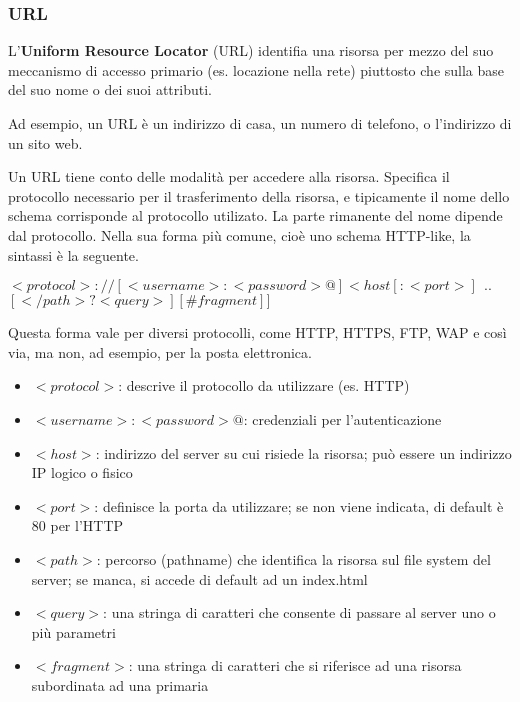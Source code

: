 \subsubsection{URL}
    
L'\textbf{Uniform Resource Locator} (URL) identifia una risorsa per mezzo del suo meccanismo di accesso primario (es. locazione nella rete) piuttosto che sulla base del suo nome o dei suoi attributi.

Ad esempio, un URL è un indirizzo di casa, un numero di telefono, o l'indirizzo di un sito web.

\vspace{3mm}

Un URL tiene conto delle modalità per accedere alla risorsa. Specifica il protocollo necessario per il trasferimento della risorsa, e tipicamente il nome dello schema corrisponde al protocollo utilizato. La parte rimanente del nome dipende dal protocollo. Nella sua forma più comune, cioè uno schema HTTP-like, la sintassi è la seguente.

\begin{center}
\(<protocol>://[<username>:<password>@]<host[:<port>]\ \ ..\)
\([</path>?<query>][\#fragment]]\)
\end{center}

Questa forma vale per diversi protocolli, come HTTP, HTTPS, FTP, WAP e così via, ma non, ad esempio, per la posta elettronica.

\begin{itemize}
    \item 
    \(<protocol>\): descrive il protocollo da utilizzare (es. HTTP)
    \item
    \(<username>:<password>@\): credenziali per l'autenticazione
    \item
    \(<host>\): indirizzo del server su cui risiede la risorsa; può essere un indirizzo IP logico o fisico
    \item
    \(<port>\): definisce la porta da utilizzare; se non viene indicata, di default è 80 per l'HTTP
    \item
    \(<path>\): percorso (pathname) che identifica la risorsa sul file system del server; se manca, si accede di default ad un index.html
    \item
    \(<query>\): una stringa di caratteri che consente di passare al server uno o più parametri
    \item
    \(<fragment>\): una stringa di caratteri che si riferisce ad una risorsa subordinata ad una primaria
\end{itemize}

